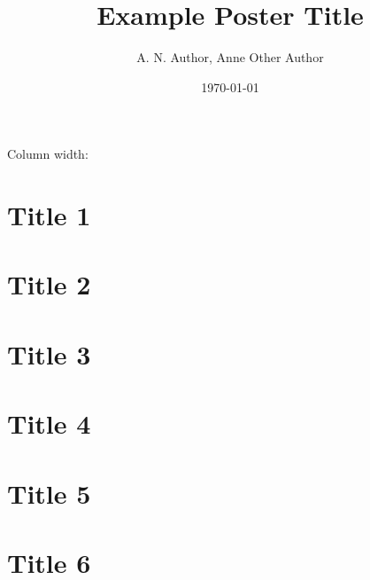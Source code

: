 \documentclass{beamer}
\title{Example Poster Title}
\author{A. N. Author, Anne Other Author}
\institute{School of Hard Knocks}
\date{\today}
\begin{document}
\justify
\begin{frame}[t]
  \maketitle

\vspace*{1cm}
\begin{postercolumn}{0.0167}
  Column width: \printlen[5][in]{\textwidth}
  \section{Title 1}
  \lipsum[1]

  \section{Title 2}
  \lipsum[2]
  
\end{postercolumn}

\begin{postercolumn}{0.3467}
    \section{Title 3}
    \lipsum[3]

    \section{Title 4}
    \lipsum[4]
\end{postercolumn}


\begin{postercolumn}{0.6767}
  \section{Title 5}
  \lipsum[5]

  \section{Title 6}
  \lipsum[6]
\end{postercolumn}

\end{frame}
\end{document}

